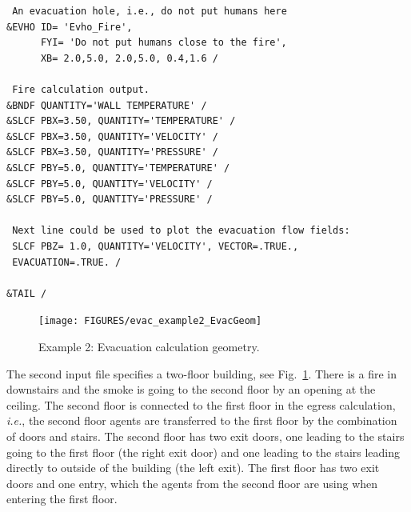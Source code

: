 \documentclass[12pt,a4paper,final,twoside]{stylevk}
\begin{document}
{\begin{verbatim}
 An evacuation hole, i.e., do not put humans here
&EVHO ID= 'Evho_Fire',
      FYI= 'Do not put humans close to the fire',
      XB= 2.0,5.0, 2.0,5.0, 0.4,1.6 /

 Fire calculation output.
&BNDF QUANTITY='WALL TEMPERATURE' / 
&SLCF PBX=3.50, QUANTITY='TEMPERATURE' /
&SLCF PBX=3.50, QUANTITY='VELOCITY' /
&SLCF PBX=3.50, QUANTITY='PRESSURE' /
&SLCF PBY=5.0, QUANTITY='TEMPERATURE' /
&SLCF PBY=5.0, QUANTITY='VELOCITY' /
&SLCF PBY=5.0, QUANTITY='PRESSURE' /

 Next line could be used to plot the evacuation flow fields:
 SLCF PBZ= 1.0, QUANTITY='VELOCITY', VECTOR=.TRUE., 
 EVACUATION=.TRUE. / 

&TAIL /
\end{verbatim}
}


\begin{figure}[!tb]
  \centerline{\texttt{[image: FIGURES/evac\_example2\_EvacGeom]}}
  \caption{Example 2: Evacuation calculation
    geometry.}\label{Fig_Ex2EvacGeom}
\end{figure}

The second input file specifies a two-floor building, see
Fig.~\ref{Fig_Ex2EvacGeom}.  There is a fire in downstairs and the
smoke is going to the second floor by an opening at the ceiling.  The
second floor is connected to the first floor in the egress
calculation, \emph{i.e.}, the second floor agents are transferred to
the first floor by the combination of doors and stairs.  The second
floor has two exit doors, one leading to the stairs going to the first
floor (the right exit door) and one leading to the stairs leading
directly to outside of the building (the left exit).  The first floor
has two exit doors and one entry, which the agents from the second
floor are using when entering the first floor.
\end{document}
